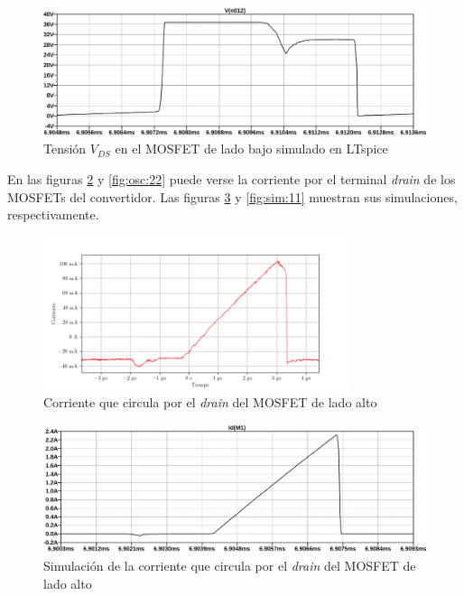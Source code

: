 \begin{figure}[H]
    \centering
    \includegraphics[width=\textwidth]{images/sim/18.pdf}
    \caption{Tensión $V_{DS}$ en el MOSFET de lado bajo simulado en LTspice}
    \label{fig:vds_simulation_low}
\end{figure}


En las figuras \ref{fig:osc:20} y \ref{fig:osc:22} puede verse la corriente por el terminal \textit{drain} de los MOSFETs del convertidor. Las figuras \ref{fig:sim:10} y \ref{fig:sim:11} muestran sus simulaciones, respectivamente.

\begin{figure}[H]
    \centering
    \includegraphics[width=0.8\textwidth]{images/capturas-osciloscopio/17-11-2022/20.png}
    \caption{Corriente que circula por el \textit{drain} del MOSFET de lado alto}
    \label{fig:osc:20}
\end{figure}

\begin{figure}[H]
    \centering
    \includegraphics[width=\textwidth]{images/sim/10.pdf}
    \caption{Simulación de la corriente que circula por el \textit{drain} del MOSFET de lado alto}
    \label{fig:sim:10}
\end{figure} 

